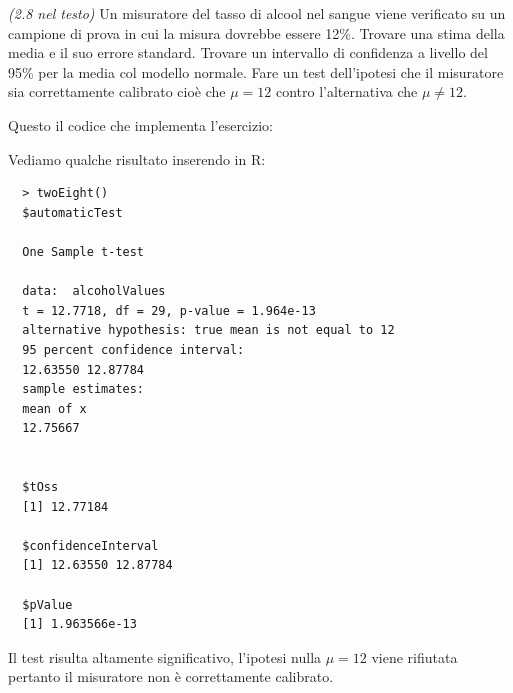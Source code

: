 \begin{exercise}{\emph{(2.8 nel testo)}}
  Un misuratore del tasso di alcool nel sangue viene verificato su un
  campione di prova in cui la misura dovrebbe essere 12\%. Trovare una
  stima della media e il suo errore standard. Trovare un intervallo di
  confidenza a livello del 95\% per la media col modello normale. Fare
  un test dell'ipotesi che il misuratore sia correttamente calibrato
  cio\`e che $\mu = 12$ contro l'alternativa che $\mu \not = 12$.
\end{exercise}
Questo il codice che implementa l'esercizio:

Vediamo qualche risultato inserendo in R:
\begin{lstlisting}
  > twoEight()
  $automaticTest

  One Sample t-test

  data:  alcoholValues 
  t = 12.7718, df = 29, p-value = 1.964e-13
  alternative hypothesis: true mean is not equal to 12 
  95 percent confidence interval:
  12.63550 12.87784 
  sample estimates:
  mean of x 
  12.75667 


  $tOss
  [1] 12.77184

  $confidenceInterval
  [1] 12.63550 12.87784

  $pValue
  [1] 1.963566e-13
\end{lstlisting}
Il test risulta altamente significativo, l'ipotesi nulla $\mu=12$
viene rifiutata pertanto il misuratore non \`e correttamente
calibrato.
  